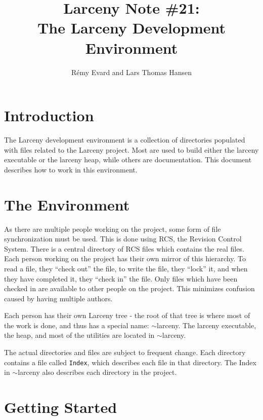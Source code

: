 
\title{Larceny Note \#21: \\
       The Larceny Development Environment}
\author{R\'{e}my Evard and Lars Thomas Hansen}


\maketitle

\section{Introduction}

The Larceny development environment is a collection of directories
populated with files related to the Larceny project.  Most are used
to build either the larceny executable or the larceny heap, while others
are documentation.  This document describes how to work in this
environment.

\section{The Environment}

As there are multiple people working on the project, some form of file
synchronization must be used.  This is done using RCS, the Revision Control
System. There is a central directory of RCS files which contains the real
files.  Each person working on the project has their own mirror of this
hierarchy.  To read a file, they ``check out'' the file, to write the file,
they ``lock'' it, and when they have completed it, they ``check in'' the
file.  Only files which have been checked in are available to other people
on the project. This minimizes confusion caused by having multiple authors.

Each person has their own Larceny tree - the root of that tree is where
most of the work is done, and thus has a special name: $\sim$larceny.
The larceny executable, the heap, and most of the utilities are located
in $\sim$larceny.

The actual directories and files are subject to frequent change.
Each directory contains a file called {\tt Index}, which describes 
each file in that directory.  The Index in $\sim$larceny also
describes each directory in the project.

\section{Getting Started}


